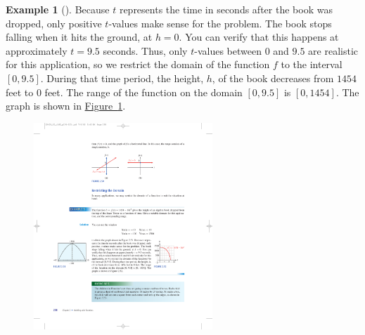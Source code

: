 \documentclass[10pt,]{book}
\theoremstyle{plain}
\theoremstyle{definition}
\theoremstyle{definition}
\theoremstyle{definition}
\newtheorem{example}[theorem]{Example}
\theoremstyle{definition}
\theoremstyle{definition}
\numberwithin{equation}{section}
\begin{document}
\begin{example}[]
    Because \(t\) represents the time in seconds after the book was dropped, only positive \(t\)-values make sense for the problem. The book stops falling when it hits the ground, at \(h = 0\). You can verify that this happens at approximately \(t = 9.5\) seconds. Thus, only \(t\)-values between \(0\) and \(9.5\) are realistic for this application, so we restrict the domain of the function \(f\) to the interval \([0, 9.5]\). During that time period, the height, \(h\), of the book decreases from \(1454\) feet to \(0\) feet. The range of the function on the domain \([0, 9.5]\) is \([0, 1454]\). The graph is shown in \hyperref[fig-falling-algebra-book]{Figure~\ref{fig-falling-algebra-book}}.
\leavevmode%
\begin{figure}
\centering
\includegraphics[width=0.60\textwidth,]{images/fig-falling-algebra-book.pdf}\caption{\label{fig-falling-algebra-book}}
\end{figure}
\end{example}
\end{document}
